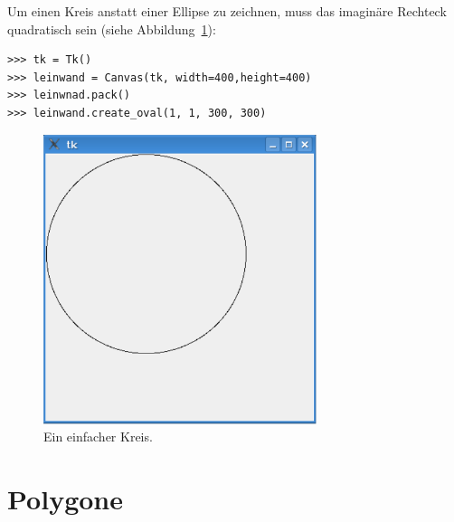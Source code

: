 \noindent
Um einen Kreis anstatt einer Ellipse zu zeichnen, muss das imaginäre Rechteck quadratisch sein (siehe Abbildung~\ref{fig40}):

\begin{Verbatim}[frame=single]
>>> tk = Tk()
>>> leinwand = Canvas(tk, width=400,height=400)
>>> leinwnad.pack()
>>> leinwand.create_oval(1, 1, 300, 300)
\end{Verbatim}

\begin{figure}
\begin{center}
\includegraphics[width=80mm]{images/figure40}
\end{center}
\caption{Ein einfacher Kreis.}\label{fig40}
\end{figure}

\section{Polygone}

